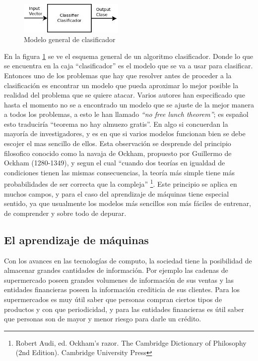 \documentclass[a4paper, 11pt, oneside]{report}
\begin{document}
\begin{figure}[htb]
\begin{center}
\leavevmode
\includegraphics[width=5cm]{diagrams/classifier1.jpg}
\end{center}
\caption{Modelo general de clasificador}
\label{fig:classif1}
\end{figure}

En la figura \ref{fig:classif1} se ve el esquema general de un algoritmo clasificador. Donde lo que se encuentra en la caja ``clasificador'' es el modelo que se va a usar para clasificar. Entonces uno de los problemas que hay que resolver antes de proceder a la clasificación es encontrar un modelo que pueda aproximar lo mejor posible la realidad del problema que se quiere atacar. Varios autores han especificado que hasta el momento no se a encontrado un modelo que se ajuste de la mejor manera a todos los problemas, a esto le han llamado {\it ``no free lunch theorem''}; es español esto traduciría ``teorema no hay almuezo gratis''. En algo si concuerdan la mayoría de investigadores, y es en que si varios modelos funcionan bien se debe escojer el mas sencillo de ellos. Esta observación se desprende del principio filosofico conocido como la navaja de Ockham, propuesto por Guillermo de Ockham (1280-1349), y segun el cual ``cuando dos teorías en igualdad de condiciones tienen las mismas consecuencias, la teoría más simple tiene más probabilidades de ser correcta que la compleja'' \footnote{Robert Audi, ed. Ockham's razor. The Cambridge Dictionary of Philosophy (2nd Edition). Cambridge University Press}. Este principio se aplica en muchos campos, y para el caso del aprendizaje de máquinas tiene especial sentido, ya que usualmente los modelos más sencillos son más fáciles de entrenar, de comprender y sobre todo de depurar.

\subsection{El aprendizaje de máquinas}
\label{sect:machineLearning}

Con los avances en las tecnologías de computo, la sociedad tiene la posibilidad de almacenar grandes cantidades de información. Por ejemplo las cadenas de supermercado poseen grandes volumenes de información de sus ventas y las entidades financieras poseen la información crediticia de sus clientes. Para los supermercados es muy útil saber que personas compran ciertos tipos de productos y con que periodicidad, y para las entidades financieras es útil saber que personas son de mayor y menor riesgo para darle un crédito.\newline
\end{document}
